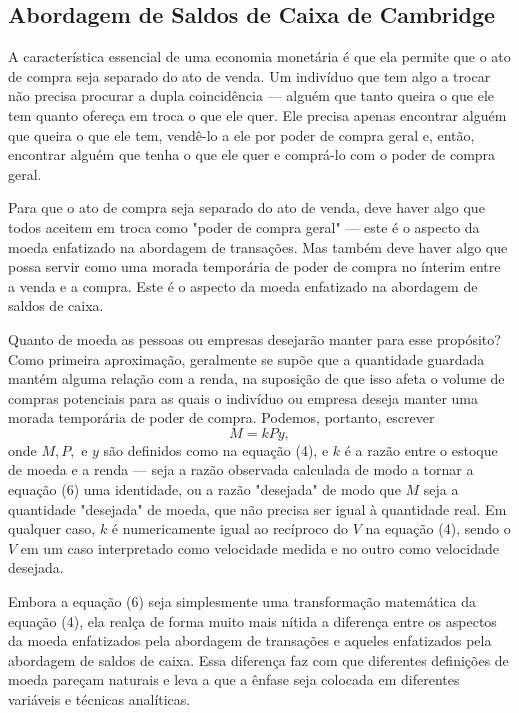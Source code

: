 \documentclass[12pt]{article}
\begin{document}
\subsection{Abordagem de Saldos de Caixa de Cambridge}

A característica essencial de uma economia monetária é que ela permite que o ato de compra seja separado do ato de venda. Um indivíduo que tem algo a trocar não precisa procurar a dupla coincidência — alguém que tanto queira o que ele tem quanto ofereça em troca o que ele quer. Ele precisa apenas encontrar alguém que queira o que ele tem, vendê-lo a ele por poder de compra geral e, então, encontrar alguém que tenha o que ele quer e comprá-lo com o poder de compra geral.

Para que o ato de compra seja separado do ato de venda, deve haver algo que todos aceitem em troca como "poder de compra geral" — este é o aspecto da moeda enfatizado na abordagem de transações. Mas também deve haver algo que possa servir como uma morada temporária de poder de compra no ínterim entre a venda e a compra. Este é o aspecto da moeda enfatizado na abordagem de saldos de caixa.

Quanto de moeda as pessoas ou empresas desejarão manter para esse propósito? Como primeira aproximação, geralmente se supõe que a quantidade guardada mantém alguma relação com a renda, na suposição de que isso afeta o volume de compras potenciais para as quais o indivíduo ou empresa deseja manter uma morada temporária de poder de compra. Podemos, portanto, escrever
\begin{equation}
M = kPy,
\end{equation}
onde $M, P,$ e $y$ são definidos como na equação (4), e $k$ é a razão entre o estoque de moeda e a renda — seja a razão observada calculada de modo a tornar a equação (6) uma identidade, ou a razão "desejada" de modo que $M$ seja a quantidade "desejada" de moeda, que não precisa ser igual à quantidade real. Em qualquer caso, $k$ é numericamente igual ao recíproco do $V$ na equação (4), sendo o $V$ em um caso interpretado como velocidade medida e no outro como velocidade desejada.

Embora a equação (6) seja simplesmente uma transformação matemática da equação (4), ela realça de forma muito mais nítida a diferença entre os aspectos da moeda enfatizados pela abordagem de transações e aqueles enfatizados pela abordagem de saldos de caixa. Essa diferença faz com que diferentes definições de moeda pareçam naturais e leva a que a ênfase seja colocada em diferentes variáveis e técnicas analíticas.
\end{document}
